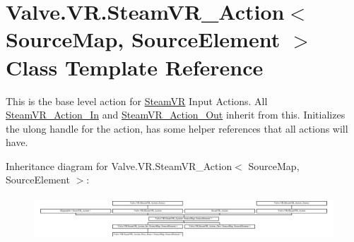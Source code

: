 \hypertarget{class_valve_1_1_v_r_1_1_steam_v_r___action}{}\section{Valve.\+V\+R.\+Steam\+V\+R\+\_\+\+Action$<$ Source\+Map, Source\+Element $>$ Class Template Reference}
\label{class_valve_1_1_v_r_1_1_steam_v_r___action}


This is the base level action for \mbox{\hyperlink{class_valve_1_1_v_r_1_1_steam_v_r}{Steam\+VR}} Input Actions. All \mbox{\hyperlink{class_valve_1_1_v_r_1_1_steam_v_r___action___in}{Steam\+V\+R\+\_\+\+Action\+\_\+\+In}} and \mbox{\hyperlink{class_valve_1_1_v_r_1_1_steam_v_r___action___out}{Steam\+V\+R\+\_\+\+Action\+\_\+\+Out}} inherit from this. Initializes the ulong handle for the action, has some helper references that all actions will have.  


Inheritance diagram for Valve.\+V\+R.\+Steam\+V\+R\+\_\+\+Action$<$ Source\+Map, Source\+Element $>$\+:\begin{figure}[H]
\begin{center}
\leavevmode
\includegraphics[height=1.643193cm]{class_valve_1_1_v_r_1_1_steam_v_r___action}
\end{center}
\end{figure}
